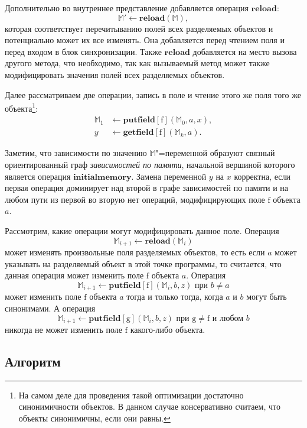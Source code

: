 \documentclass[14pt,titlepage,draft]{extarticle}
\newcommand{\M}{\ensuremath{\mathbb{M}}}
\newcommand{\field}[1]{\mathrm{#1}}
\newcommand{\op}[1]{\mathbf{#1}}
\begin{document}
    Дополнительно во внутреннее представление добавляется операция
    $\op{reload}$:
    \[ \M' \gets \op{reload}(\M), \]
    которая соответствует перечитыванию полей всех разделяемых объектов и
    потенциально может их все изменять.
    Она добавляется перед чтением  поля и перед входом в блок
    синхронизации. Также $\op{reload}$ добавляется на место вызова другого
    метода, что необходимо, так как вызываемый метод может также модифицировать
    значения полей всех разделяемых объектов.

    Далее рассматриваем две операции, запись в поле и чтение этого же поля того
    же объекта\footnote{
      На самом деле для проведения такой оптимизации достаточно синонимичности
      объектов. В данном случае консервативно считаем, что объекты
      синонимичны, если они равны.
    }:
    \begin{align*}
      \M_1 &\gets \op{putfield}[\field{f}](\M_0, a, x), \\
      y &\gets \op{getfield}[\field{f}](\M_k, a).
    \end{align*}

    Заметим, что зависимости по значению \M"=переменной образуют связный
    ориентированный граф \emph{зависимостей по памяти}, начальной вершиной
    которого является операция $\op{initialmemory}$.
    Замена переменной $y$ на $x$ корректна, если первая операция доминирует над
    второй в графе зависимостей по памяти и на любом пути из первой во
    вторую нет операций, модифицирующих поле $\field{f}$ объекта $a$.

    Рассмотрим, какие операции могут модифицировать данное поле.
    Операция \[\M_{i+1} \gets \op{reload}(\M_i)\] может изменять произвольные
    поля разделяемых объектов, то есть если $a$ может указывать на разделяемый
    объект в этой точке программы, то считается, что данная операция может
    изменить поле $\field{f}$ объекта $a$.
    Операция
    \[\M_{i+1} \gets \op{putfield}[\field{f}](\M_i, b, z)
      \text{ при } b \neq a\]
    может изменить поле $\field{f}$ объекта $a$ тогда и только тогда, когда
    $a$ и $b$ могут быть синонимами.
    А операция
    \[\M_{i+1} \gets \op{putfield}[\field{g}](\M_i, b, z)
      \text{ при } \field{g} \neq \field{f} \text{ и любом } b\]
    никогда не может изменить поле $\field{f}$ какого-либо объекта.

  \subsection{Алгоритм}
\end{document}
